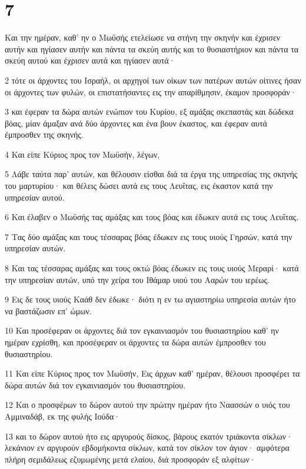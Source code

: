 \chapter{7}

\par Και την ημέραν, καθ' ην ο Μωϋσής ετελείωσε να στήνη την σκηνήν και έχρισεν αυτήν και ηγίασεν αυτήν και πάντα τα σκεύη αυτής και το θυσιαστήριον και πάντα τα σκεύη αυτού και έχρισεν αυτά και ηγίασεν αυτά·
\par 2 τότε οι άρχοντες του Ισραήλ, οι αρχηγοί των οίκων των πατέρων αυτών οίτινες ήσαν οι άρχοντες των φυλών, οι επιστατήσαντες εις την απαρίθμησιν, έκαμον προσφοράν·
\par 3 και έφεραν τα δώρα αυτών ενώπιον του Κυρίου, εξ αμάξας σκεπαστάς και δώδεκα βόας, μίαν άμαξαν ανά δύο άρχοντες και ένα βουν έκαστος, και έφεραν αυτά έμπροσθεν της σκηνής.
\par 4 Και είπε Κύριος προς τον Μωϋσήν, λέγων,
\par 5 Λάβε ταύτα παρ' αυτών, και θέλουσιν είσθαι διά τα έργα της υπηρεσίας της σκηνής του μαρτυρίου· και θέλεις δώσει αυτά εις τους Λευΐτας, εις έκαστον κατά την υπηρεσίαν αυτού.
\par 6 Και έλαβεν ο Μωϋσής τας αμάξας και τους βόας και έδωκεν αυτά εις τους Λευΐτας.
\par 7 Τας δύο αμάξας και τους τέσσαρας βόας έδωκεν εις τους υιούς Γηρσών, κατά την υπηρεσίαν αυτών.
\par 8 Και τας τέσσαρας αμάξας και τους οκτώ βόας έδωκεν εις τους υιούς Μεραρί· κατά την υπηρεσίαν αυτών, υπό την χείρα του Ιθάμαρ υιού του Ααρών του ιερέως.
\par 9 Εις δε τους υιούς Καάθ δεν έδωκε· διότι η εν τω αγιαστηρίω υπηρεσία αυτών ήτο να βαστάζωσιν επ' ώμων.
\par 10 Και προσέφεραν οι άρχοντες διά τον εγκαινιασμόν του θυσιαστηρίου καθ' ην ημέραν εχρίσθη, και προσέφεραν οι άρχοντες τα δώρα αυτών έμπροσθεν του θυσιαστηρίου.
\par 11 Και είπε Κύριος προς τον Μωϋσήν, Εις άρχων καθ' ημέραν, θέλουσι προσφέρει τα δώρα αυτών διά τον εγκαινιασμόν του θυσιαστηρίου.
\par 12 Και ο προσφέρων το δώρον αυτού την πρώτην ημέραν ήτο Ναασσών ο υιός του Αμμιναδάβ, εκ της φυλής Ιούδα·
\par 13 και το δώρον αυτού ήτο εις αργυρούς δίσκος, βάρους εκατόν τριάκοντα σίκλων· λεκάνιον εν αργυρούν εβδομήκοντα σίκλων, κατά τον σίκλον τον άγιον· αμφότερα πλήρη σεμιδάλεως εζυμωμένης μετά ελαίου, διά προσφοράν εξ αλφίτων·
